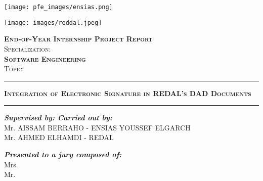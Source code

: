
\thispagestyle{empty}
\begin{center}
  \begin{minipage}{0.48\textwidth} \begin{flushleft}
    \texttt{[image: pfe\_images/ensias.png]}
  \end{flushleft}\end{minipage}
  \begin{minipage}{0.48\textwidth} \begin{flushright}
    \texttt{[image: images/reddal.jpeg]}
  \end{flushright}\end{minipage}

  \vspace*{2.5cm}

  \textsc{\huge \bfseries End-of-Year Internship Project Report }\\[0.5cm]
  \textsc{\small Specialization: }\\[0.5cm]
  \textsc{\huge \bfseries   Software Engineering}\\[0.5cm]
  
  
  \textsc{\small Topic:}\\[0.3cm]
  \begin{center}
 \rule{1\linewidth}{1pt}
 \end{center}
  \textsc{\huge \bfseries Integration of Electronic Signature in REDAL's DAD Documents  } \\[0.9cm]
  \begin{center}
 \rule{1\linewidth}{1pt}
 \end{center}
 \vspace{6mm}
  
 \begin{minipage}{1\textwidth}
  \begin{flushleft} \large
    
    \emph{\bfseries Supervised by: \qquad \qquad \qquad \qquad \qquad \qquad \qquad \qquad Carried out by:} \\[0.3cm]
     Mr. AISSAM BERRAHO  - ENSIAS   \;  \qquad \qquad \qquad    YOUSSEF ELGARCH \\
     Mr. AHMED ELHAMDI - REDAL \\
     

  \end{flushleft} 
  \vspace{0.8cm} 
  \medskip
  \begin{center} \large
    \emph{\bfseries Presented to a jury composed of:%
    }\\[0.3cm]
    Mrs.   \\[0.2cm]
    Mr.    \\[0.2cm]


\end{center}
\end{minipage}
\end{center}
